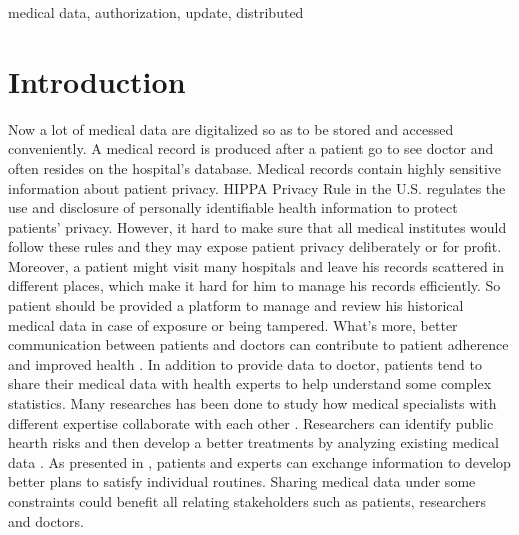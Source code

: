 \documentclass[conference]{IEEEtran}
\begin{document}
\begin{IEEEkeywords}
medical data, authorization, update, distributed
\end{IEEEkeywords}

\section{Introduction}

Now a lot of medical data are digitalized so as to be stored and accessed conveniently. A medical record is produced after a patient go to see doctor and often resides on the hospital's database. Medical records contain highly sensitive information about patient privacy. HIPPA Privacy Rule  \cite{centers2004hipaa} in the U.S. regulates the use and disclosure of personally identifiable health information to protect patients' privacy. However, it hard to make sure that all medical institutes would follow these rules and they may expose patient privacy deliberately or for profit. Moreover, a patient might visit many hospitals and leave his records scattered \cite{zhang2016secure} in different places, which make it hard for him to manage his records efficiently. So patient should be provided a platform to manage and review his historical medical data in case of exposure or being tampered. What's more, better communication between patients and doctors can contribute to patient adherence \cite{zolnierek2009physician} and  improved health \cite{street2009does}. In addition to provide data to doctor, patients tend to share their medical data with health experts to help understand some complex statistics. Many researches has been done to study how medical specialists with different expertise collaborate with each other \cite{fitzpatrick2013review}.  Researchers can identify public hearth risks and then develop a better treatments by analyzing existing medical data \cite{office2015report}. As presented in \cite{chung2018using},  patients and experts can exchange information to develop better plans to satisfy individual routines. Sharing medical data under some constraints could benefit all relating stakeholders such as patients, researchers and doctors. 
\end{document}
